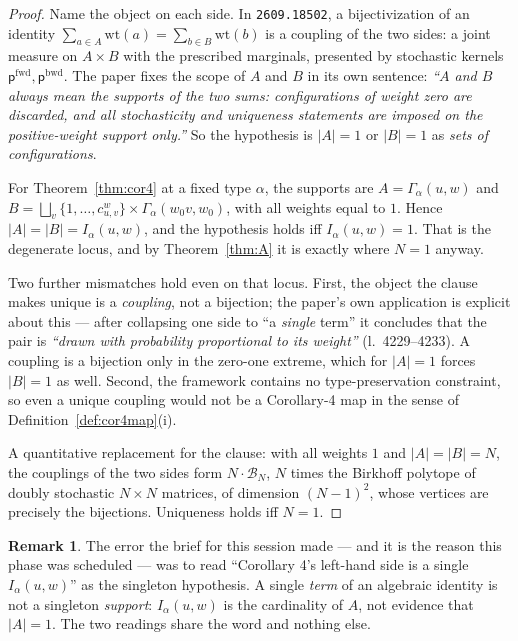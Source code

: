 \documentclass[11pt]{article}
\theoremstyle{plain}
\theoremstyle{definition}
\newtheorem{remark}[theorem]{Remark}
\newcommand{\Gam}{\Gamma}
\newcommand{\wo}{w_0}
\begin{document}
\begin{proof}
Name the object on each side.  In \texttt{2609.18502}, a bijectivization of an
identity $\sum_{a\in A}\mathrm{wt}(a)=\sum_{b\in B}\mathrm{wt}(b)$ is a coupling
of the two sides: a joint measure on $A\times B$ with the prescribed marginals,
presented by stochastic kernels $\mathsf{p}^{\mathrm{fwd}},
\mathsf{p}^{\mathrm{bwd}}$.  The paper fixes the scope of $A$ and $B$ in its own
sentence: \emph{``$A$ and $B$ always mean the supports of the two sums:
configurations of weight zero are discarded, and all stochasticity and uniqueness
statements are imposed on the positive-weight support only.''}  So the hypothesis
is $|A|=1$ or $|B|=1$ as \emph{sets of configurations}.

For Theorem~\ref{thm:cor4} at a fixed type $\alpha$, the supports are
$A=\Gam_\alpha(u,w)$ and $B=\bigsqcup_v\{1,\dots,c^w_{u,v}\}\times
\Gam_\alpha(\wo v,\wo)$, with all weights equal to $1$.  Hence
$|A|=|B|=I_\alpha(u,w)$, and the hypothesis holds iff $I_\alpha(u,w)=1$.  That is
the degenerate locus, and by Theorem~\ref{thm:A} it is exactly where
$N=1$ anyway.

Two further mismatches hold even on that locus.  First, the object the clause
makes unique is a \emph{coupling}, not a bijection; the paper's own application
is explicit about this --- after collapsing one side to ``a \emph{single} term''
it concludes that the pair is \emph{``drawn with probability proportional to its
weight''} (l.~4229--4233).  A coupling is a bijection only in the zero-one
extreme, which for $|A|=1$ forces $|B|=1$ as well.  Second, the framework
contains no type-preservation constraint, so even a unique coupling would not be
a Corollary-4 map in the sense of Definition~\ref{def:cor4map}(i).

A quantitative replacement for the clause: with all weights $1$ and
$|A|=|B|=N$, the couplings of the two sides form $N\cdot\mathcal{B}_N$, $N$ times
the Birkhoff polytope of doubly stochastic $N\times N$ matrices, of dimension
$(N-1)^2$, whose vertices are precisely the bijections.  Uniqueness holds iff
$N=1$.
\end{proof}

\begin{remark}
The error the brief for this session made --- and it is the reason this phase was
scheduled --- was to read ``Corollary 4's left-hand side is a single
$I_\alpha(u,w)$'' as the singleton hypothesis.  A single \emph{term} of an
algebraic identity is not a singleton \emph{support}: $I_\alpha(u,w)$ is the
cardinality of $A$, not evidence that $|A|=1$.  The two readings share the word
and nothing else.
\end{remark}
\end{document}
